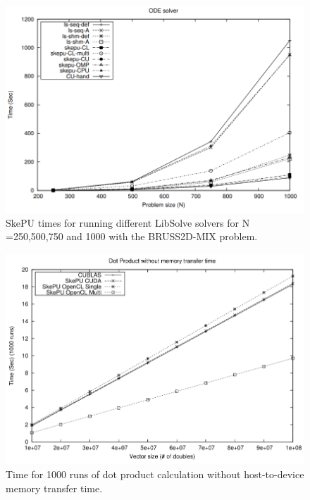 \begin{figure}[!htbp]
    \centering
    \includegraphics[width=\textwidth]{Introduction/Figs/SkePUComparison.png}
    \caption{SkePU times for running different LibSolve solvers for N =250,500,750 and 1000 with the BRUSS2D-MIX problem. \cite{enmyren2010skepu}}
    \label{fig:SkepuComparisonODE}
\end{figure}

\begin{figure}[!htbp]
    \centering
    \includegraphics[width=\textwidth]{Introduction/Figs/SkePUComparisonDOT.png}
    \caption{Time for 1000 runs of dot product calculation without host-to-device memory transfer time. \cite{enmyren2010skepu}}
    \label{fig:SkepuComparisonDOT}
\end{figure}


